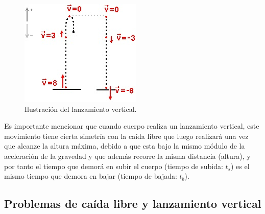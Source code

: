\begin{figure}[ht]
 \centering
 \includegraphics[scale=0.7]{images/lanzamientovertical.jpg}
 \caption{Ilustración del lanzamiento vertical.}\label{lanzamientov}
\end{figure}   
 
Es importante mencionar que cuando cuerpo realiza un lanzamiento vertical, este movimiento tiene cierta simetría con la caída 
libre que luego realizará una vez que alcanze la altura máxima, debido a que esta bajo la mismo módulo de la aceleración de la 
gravedad y que además recorre la misma distancia (altura), y por tanto el tiempo que demorá en subir el cuerpo (tiempo de subida: 
$t_s$) es el mismo tiempo que demora en bajar (tiempo de bajada: $t_b$).

\subsection{Problemas de caída libre y lanzamiento vertical}


